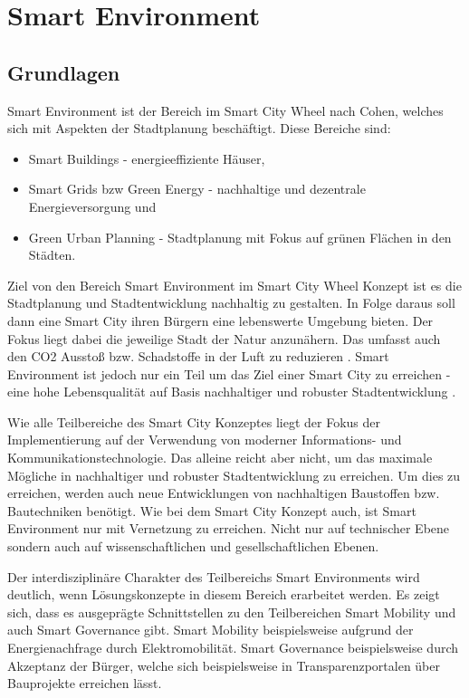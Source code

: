 \section{Smart Environment}

\subsection{Grundlagen}
Smart Environment ist der Bereich im Smart City Wheel nach Cohen, welches sich mit Aspekten der Stadtplanung beschäftigt.
Diese Bereiche sind:
\begin{itemize}
	\item Smart Buildings - energieeffiziente Häuser,
	\item Smart Grids bzw Green Energy - nachhaltige und dezentrale Energieversorgung und
	\item Green Urban Planning - Stadtplanung mit Fokus auf grünen Flächen in den Städten.
\end{itemize}

Ziel von den Bereich Smart Environment im Smart City Wheel Konzept ist es die Stadtplanung und Stadtentwicklung nachhaltig zu gestalten.
In Folge daraus soll dann eine Smart City ihren Bürgern eine lebenswerte Umgebung bieten.
Der Fokus liegt dabei die jeweilige Stadt der Natur anzunähern.
Das umfasst auch den CO2 Ausstoß bzw. Schadstoffe in der Luft zu reduzieren \autocite[vgl.][S. 4]{Monzon.2015}.
Smart Environment ist jedoch nur ein Teil um das Ziel einer Smart City zu erreichen - eine hohe Lebensqualität auf Basis nachhaltiger und robuster Stadtentwicklung \autocite[vgl.][S. 3]{Monzon.2015}.

Wie alle Teilbereiche des Smart City Konzeptes liegt der Fokus der Implementierung auf der Verwendung von moderner Informations- und Kommunikationstechnologie.
Das alleine reicht aber nicht, um das maximale Mögliche in nachhaltiger und robuster Stadtentwicklung zu erreichen.
Um dies zu erreichen, werden auch neue Entwicklungen von nachhaltigen Baustoffen bzw. Bautechniken benötigt.
Wie bei dem Smart City Konzept auch, ist Smart Environment nur mit Vernetzung zu erreichen.
Nicht nur auf technischer Ebene sondern auch auf wissenschaftlichen und gesellschaftlichen Ebenen.

Der interdisziplinäre Charakter des Teilbereichs Smart Environments wird deutlich, wenn Lösungskonzepte in diesem Bereich erarbeitet werden.
Es zeigt sich, dass es ausgeprägte Schnittstellen zu den Teilbereichen Smart Mobility und auch Smart Governance gibt.
Smart Mobility beispielsweise aufgrund der Energienachfrage durch Elektromobilität.
Smart Governance beispielsweise durch Akzeptanz der Bürger, welche sich beispielsweise in Transparenzportalen über Bauprojekte erreichen lässt.

